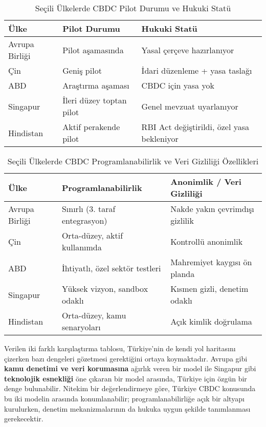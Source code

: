 \documentclass[a4paper,12pt]{article}
\begin{document}
\begin{table}[h!]
\centering
\begin{tabular}{|l|l|l|}
\hline
\textbf{Ülke} & \textbf{Pilot Durumu} & \textbf{Hukuki Statü} \\
\hline
Avrupa Birliği & Pilot aşamasında & Yasal çerçeve hazırlanıyor \\
\hline
Çin & Geniş pilot & İdari düzenleme + yasa taslağı \\
\hline
ABD & Araştırma aşaması & CBDC için yasa yok \\
\hline
Singapur & İleri düzey toptan pilot & Genel mevzuat uyarlanıyor \\
\hline
Hindistan & Aktif perakende pilot & RBI Act değiştirildi, özel yasa bekleniyor \\
\hline
\end{tabular}
\caption{Seçili Ülkelerde CBDC Pilot Durumu ve Hukuki Statü}
\end{table}


\begin{table}[h!]
\centering
\begin{tabular}{|l|l|l|}
\hline
\textbf{Ülke} & \textbf{Programlanabilirlik} & \textbf{Anonimlik / Veri Gizliliği} \\
\hline
Avrupa Birliği & Sınırlı (3. taraf entegrasyon) & Nakde yakın çevrimdışı gizlilik \\
\hline
Çin & Orta-düzey, aktif kullanımda & Kontrollü anonimlik \\
\hline
ABD & İhtiyatlı, özel sektör testleri & Mahremiyet kaygısı ön planda \\
\hline
Singapur & Yüksek vizyon, sandbox odaklı & Kısmen gizli, denetim odaklı \\
\hline
Hindistan & Orta-düzey, kamu senaryoları & Açık kimlik doğrulama\\
\hline
\end{tabular}
\caption{Seçili Ülkelerde CBDC Programlanabilirlik ve Veri Gizliliği Özellikleri}
\end{table}







Verilen iki farklı karşılaştırma tablosu, Türkiye’nin de kendi yol haritasını çizerken bazı dengeleri gözetmesi gerektiğini ortaya koymaktadır. Avrupa gibi \textbf{kamu denetimi ve veri korumasına} ağırlık veren bir model ile Singapur gibi \textbf{teknolojik esnekliği} öne çıkaran bir model arasında, Türkiye için özgün bir denge bulunabilir. Nitekim bir değerlendirmeye göre, Türkiye CBDC konusunda bu iki modelin arasında konumlanabilir; programlanabilirliğe açık bir altyapı kurulurken, denetim mekanizmalarının da hukuka uygun şekilde tanımlanması gerekecektir.
\end{document}
